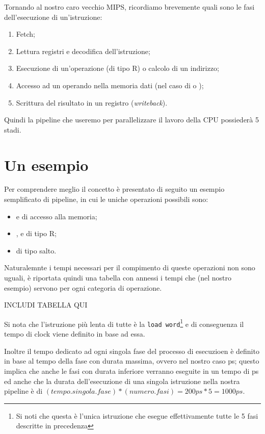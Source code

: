 \documentclass[class=book, crop=false, oneside]{standalone}
\begin{document}
Tornando al nostro caro vecchio MIPS, ricordiamo brevemente quali sono le fasi dell'esecuzione di un'istruzione:
\begin{enumerate}[noitemsep]
	\item Fetch;
	\item Lettura registri e decodifica dell'istruzione;
	\item Esecuzione di un'operazione (di tipo R) o calcolo di un indirizzo;
	\item Accesso ad un operando nella memoria dati (nel caso di  o );
	\item Scrittura del risultato in un registro (\emph{writeback}).
\end{enumerate}
Quindi la pipeline che useremo per parallelizzare il lavoro della CPU possiederà 5 stadi.

\section{Un esempio}
Per comprendere meglio il concetto è presentato di seguito un esempio semplificato di pipeline, in cui le uniche operazioni possibili sono:
\begin{itemize}[nolistsep]
	\item {} e  di accesso alla memoria;
	\item {},  e  di tipo R;
	\item {} di tipo salto.
\end{itemize}
Naturalemnte i tempi necessari per il compimento di queste operazioni non sono uguali, è riportata quindi una tabella con annessi i tempi che (nel nostro esempio) servono per ogni categoria di operazione.

INCLUDI TABELLA QUI

Si nota che l'istruzione più lenta di tutte è la \texttt{load word}\footnote{Si noti che questa è l'unica istruzione che esegue effettivamente tutte le 5 fasi descritte in precedenza} e di conseguenza il tempo di clock viene definito in base ad essa.

Inoltre il tempo dedicato ad ogni singola fase del processo di esecuzioen è definito in base al tempo della fase con durata massima, ovvero nel nostro caso \unit[200]{ps}; questo implica che anche le fasi con durata inferiore verranno eseguite in un tempo di \unit[200]{ps} ed anche che la durata dell'esecuzione di una singola istruzione nella nostra pipeline è di \((tempo.singola.fase)*(numero.fasi)=200ps*5=1000ps\).
\end{document}
